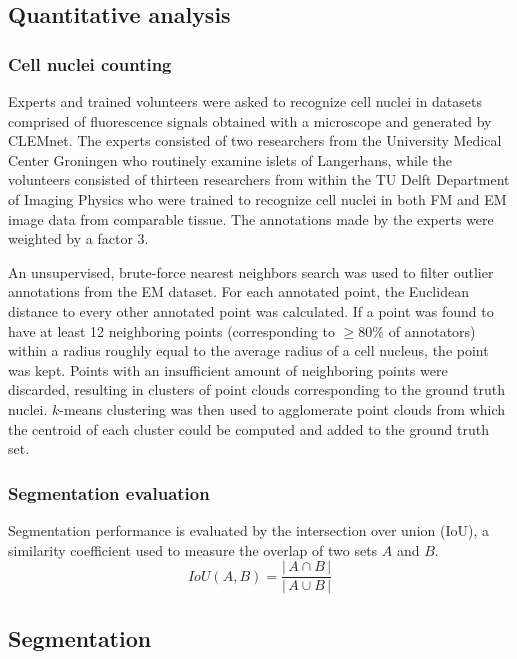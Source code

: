\subsection{Quantitative analysis}
\label{sec:4methods_analysis}

\subsubsection{Cell nuclei counting}
Experts and trained volunteers were asked to recognize cell nuclei in datasets comprised of fluorescence signals obtained with a microscope and generated by CLEMnet. The experts consisted of two researchers from the University Medical Center Groningen who routinely examine islets of Langerhans, while the volunteers consisted of thirteen researchers from within the TU Delft Department of Imaging Physics who were trained to recognize cell nuclei in both FM and EM image data from comparable tissue. The annotations made by the experts were weighted by a factor 3.

An unsupervised, brute-force nearest neighbors search was used to filter outlier annotations from the EM dataset. For each annotated point, the Euclidean distance to every other annotated point was calculated. If a point was found to have at least 12 neighboring points (corresponding to ${\ge}$80\% of annotators) within a radius roughly equal to the average radius of a cell nucleus, the point was kept. Points with an insufficient amount of neighboring points were discarded, resulting in clusters of point clouds corresponding to the ground truth nuclei. $k$-means clustering was then used to agglomerate point clouds from which the centroid of each cluster could be computed and added to the ground truth set.

\subsubsection{Segmentation evaluation}
Segmentation performance is evaluated by the intersection over union (IoU), a similarity coefficient used to measure the overlap of two sets $A$ and $B$.
%
\begin{equation}
    IoU(A, B) = \frac{\left|\,A \cap B\,\right|}{\left|\,A \cup B\,\right|}
\end{equation}



\subsection{Segmentation}
\label{sec:4methods_segmentation}

